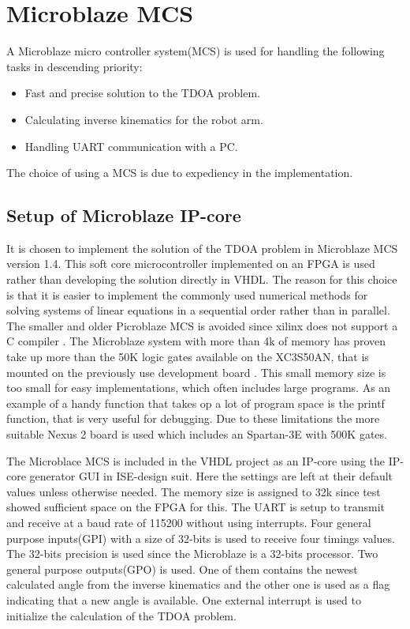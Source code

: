 \section{Microblaze MCS}
A Microblaze micro controller system(MCS) is used for handling the following tasks in descending priority:
\begin{itemize}
	\item Fast and precise solution to the TDOA problem.
	\item Calculating inverse kinematics for the robot arm.
	\item Handling UART communication with a PC.
\end{itemize}
The choice of using a MCS is due to expediency in the implementation.
%
\subsection{Setup of Microblaze IP-core} 
It is chosen to implement the solution of the TDOA problem in Microblaze MCS version 1.4. This soft core microcontroller implemented on an FPGA is used rather than developing the solution directly in VHDL. 
The reason for this choice is that it is easier to implement the commonly used numerical methods for solving systems of linear equations in a sequential order rather than in parallel. The smaller and older Picroblaze MCS is avoided since xilinx does not support a C compiler \cite{picoBlazeCompiler}. 
The Microblaze system with more than 4k of memory has proven take up more than the 50K logic gates available on the XC3S50AN, that is mounted on the previously use development board \cite{spartan3AN}.
This small memory size is too small for easy implementations, which often includes large programs. As an example of a handy function that takes op a lot of program space is the printf function, that is very useful for debugging.
Due to these limitations the more suitable Nexus 2 board is used which includes an Spartan-3E with 500K gates.  

The Microblace MCS is included in the VHDL project as an IP-core using the IP-core generator GUI in ISE-design suit. Here the settings are left at their default values unless otherwise needed. The memory size is assigned to 32k since test showed sufficient space on the FPGA for this. The UART is setup to transmit and receive at a baud rate of 115200 without using interrupts. Four general purpose inputs(GPI) with a size of 32-bits is used to receive four timings values. The 32-bits precision is used since the Microblaze is a 32-bits processor. 
Two general purpose outputs(GPO) is used. One of them contains the newest calculated angle from the inverse kinematics and the other one is used as a flag indicating that a new angle is available. 
One external interrupt is used to initialize the calculation of the TDOA problem. 
%
